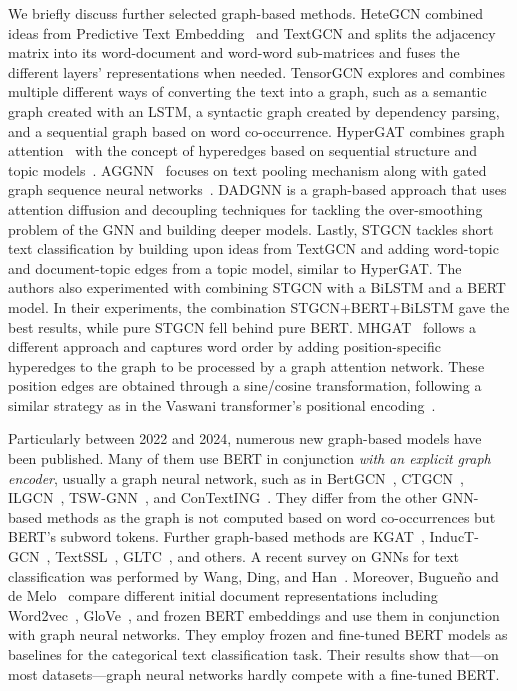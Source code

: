 \documentclass[lettersize,journal]{IEEEtran}
\begin{document}
We briefly discuss further selected graph-based methods.
HeteGCN combined ideas from Predictive Text Embedding~\cite{DBLP:conf/kdd/TangQM15} and TextGCN and splits the adjacency matrix into its word-document and word-word sub-matrices and fuses the different layers' representations when needed.
TensorGCN explores and combines multiple different ways of converting the text into a graph, such as a semantic graph created with an LSTM, a syntactic graph created by dependency parsing, and a sequential graph based on word co-occurrence. 
HyperGAT combines graph attention~\cite{velickovic2018graph} with the concept of hyperedges based on sequential structure and topic models~\cite{DBLP:journals/jmlr/BleiNJ03}.
AGGNN~\cite{aggnn} focuses on text pooling mechanism along with gated graph sequence neural networks~\cite{DBLP:journals/corr/LiTBZ15}.
DADGNN is a graph-based approach that uses attention diffusion and decoupling techniques for tackling the over-smoothing problem of the GNN and building deeper models. 
Lastly, STGCN tackles short text classification by building upon ideas from TextGCN and adding word-topic and document-topic edges from a topic model, similar to HyperGAT.
The authors also experimented with combining STGCN with a BiLSTM and a BERT model.
In their experiments, the combination STGCN+BERT+BiLSTM gave the best results, while pure STGCN fell behind pure BERT. MHGAT~\cite{mhgat} follows a different approach and captures word order by adding position-specific hyperedges to the graph to be processed by a graph attention network. These position edges are obtained through a sine/cosine transformation, following a similar strategy as in the Vaswani transformer's positional encoding~\cite{DBLP:conf/nips/VaswaniSPUJGKP17}.

Particularly between 2022 and 2024, numerous new graph-based models have been published.
Many of them use BERT in conjunction \textit{with an explicit graph encoder}, usually a graph neural network, such as in BertGCN~\cite{DBLP:conf/acl/LinMSHKLW21}, CTGCN~\cite{ctgcn}, ILGCN~\cite{ilgcn}, TSW-GNN~\cite{tsw-gnn}, and ConTextING~\cite{DBLP:conf/coling/HuangCC22}.
They differ from the other GNN-based methods as the graph is not computed based on word co-occurrences but BERT's subword tokens.
Further graph-based methods are KGAT~\cite{DBLP:conf/nlpcc/WangWYZSJWZ22}, InducT-GCN~\cite{induct-gcn}, TextSSL~\cite{textssl2022}, GLTC~\cite{gltc2023}, and others.
A recent survey on GNNs for text classification was performed by Wang, Ding, and Han~\cite{wang2023graph}.
Moreover, Bugue\~{n}o and de Melo~\cite{buguenoConnectingDotsWhat2023} compare different initial document representations including Word2vec~\cite{DBLP:conf/nips/MikolovSCCD13}, GloVe~\cite{DBLP:conf/emnlp/PenningtonSM14}, and frozen BERT embeddings and use them in conjunction with graph neural networks. 
They employ frozen and fine-tuned BERT models as baselines for the categorical text classification task. 
Their results show that---on most datasets---graph neural networks hardly compete with a fine-tuned BERT.
\end{document}
